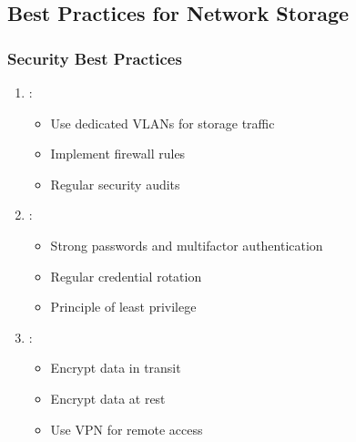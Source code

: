 \documentclass[letterpaper,10pt,english]{sphinxmanual}
\begin{document}
\begin{sphinxVerbatim}[commandchars=\\\{\}]
\end{sphinxVerbatim}


\subsection{Best Practices for Network Storage}
\label{\detokenize{network-storage:best-practices-for-network-storage}}

\subsubsection{Security Best Practices}
\label{\detokenize{network-storage:security-best-practices}}\begin{enumerate}
%
\item {} 
\sphinxAtStartPar
{}:
\begin{itemize}
\item {} 
\sphinxAtStartPar
Use dedicated VLANs for storage traffic

\item {} 
\sphinxAtStartPar
Implement firewall rules

\item {} 
\sphinxAtStartPar
Regular security audits

\end{itemize}

\item {} 
\sphinxAtStartPar
{}:
\begin{itemize}
\item {} 
\sphinxAtStartPar
Strong passwords and multi\sphinxhyphen{}factor authentication

\item {} 
\sphinxAtStartPar
Regular credential rotation

\item {} 
\sphinxAtStartPar
Principle of least privilege

\end{itemize}

\item {} 
\sphinxAtStartPar
{}:
\begin{itemize}
\item {} 
\sphinxAtStartPar
Encrypt data in transit

\item {} 
\sphinxAtStartPar
Encrypt data at rest

\item {} 
\sphinxAtStartPar
Use VPN for remote access

\end{itemize}

\end{enumerate}
\end{document}
